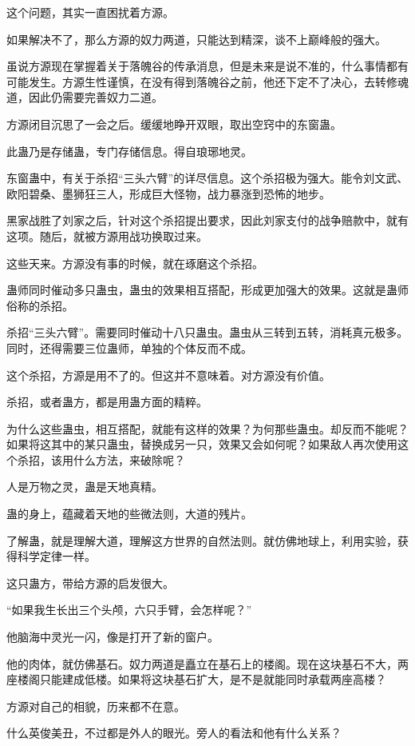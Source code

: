 \begin{this_body}
这个问题，其实一直困扰着方源。

如果解决不了，那么方源的奴力两道，只能达到精深，谈不上巅峰般的强大。

虽说方源现在掌握着关于落魄谷的传承消息，但是未来是说不准的，什么事情都有可能发生。方源生性谨慎，在没有得到落魄谷之前，他还下定不了决心，去转修魂道，因此仍需要完善奴力二道。

方源闭目沉思了一会之后。缓缓地睁开双眼，取出空窍中的东窗蛊。

此蛊乃是存储蛊，专门存储信息。得自琅琊地灵。

东窗蛊中，有关于杀招“三头六臂”的详尽信息。这个杀招极为强大。能令刘文武、欧阳碧桑、墨狮狂三人，形成巨大怪物，战力暴涨到恐怖的地步。

黑家战胜了刘家之后，针对这个杀招提出要求，因此刘家支付的战争赔款中，就有这项。随后，就被方源用战功换取过来。

这些天来。方源没有事的时候，就在琢磨这个杀招。

蛊师同时催动多只蛊虫，蛊虫的效果相互搭配，形成更加强大的效果。这就是蛊师俗称的杀招。

杀招“三头六臂”。需要同时催动十八只蛊虫。蛊虫从三转到五转，消耗真元极多。同时，还得需要三位蛊师，单独的个体反而不成。

这个杀招，方源是用不了的。但这并不意味着。对方源没有价值。

杀招，或者蛊方，都是用蛊方面的精粹。

为什么这些蛊虫，相互搭配，就能有这样的效果？为何那些蛊虫。却反而不能呢？如果将这其中的某只蛊虫，替换成另一只，效果又会如何呢？如果敌人再次使用这个杀招，该用什么方法，来破除呢？

人是万物之灵，蛊是天地真精。

蛊的身上，蕴藏着天地的些微法则，大道的残片。

了解蛊，就是理解大道，理解这方世界的自然法则。就仿佛地球上，利用实验，获得科学定律一样。

这只蛊方，带给方源的启发很大。

“如果我生长出三个头颅，六只手臂，会怎样呢？”

他脑海中灵光一闪，像是打开了新的窗户。

他的肉体，就仿佛基石。奴力两道是矗立在基石上的楼阁。现在这块基石不大，两座楼阁只能建成低楼。如果将这块基石扩大，是不是就能同时承载两座高楼？

方源对自己的相貌，历来都不在意。

什么英俊美丑，不过都是外人的眼光。旁人的看法和他有什么关系？


\end{this_body}
